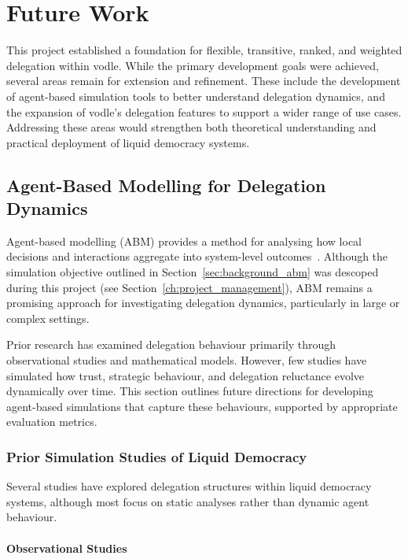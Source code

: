 \chapter{Future Work}\label{ch:future}

This project established a foundation for flexible, transitive, ranked, and weighted delegation within vodle. While the primary development goals were achieved, several areas remain for extension and refinement. These include the development of agent-based simulation tools to better understand delegation dynamics, and the expansion of vodle's delegation features to support a wider range of use cases. Addressing these areas would strengthen both theoretical understanding and practical deployment of liquid democracy systems.

\section{Agent-Based Modelling for Delegation Dynamics}

Agent-based modelling (ABM) provides a method for analysing how local decisions and interactions aggregate into system-level outcomes~\citep{bonabeau2002agent}. Although the simulation objective outlined in Section~\ref{sec:background_abm} was descoped during this project (see Section~\ref{ch:project_management}), ABM remains a promising approach for investigating delegation dynamics, particularly in large or complex settings.

Prior research has examined delegation behaviour primarily through observational studies and mathematical models. However, few studies have simulated how trust, strategic behaviour, and delegation reluctance evolve dynamically over time. This section outlines future directions for developing agent-based simulations that capture these behaviours, supported by appropriate evaluation metrics.

\subsection{Prior Simulation Studies of Liquid Democracy}

Several studies have explored delegation structures within liquid democracy systems, although most focus on static analyses rather than dynamic agent behaviour.

\subsubsection{Observational Studies}

